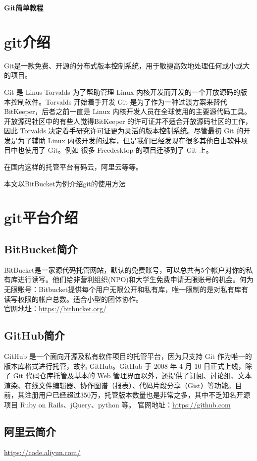 \documentclass[a4paper,12pt]{ctexart}
\begin{document}
\begin{center}
\huge \textbf{Git简单教程}
\end{center}

\tableofcontents
\newpage
\section{git介绍}
Git是一款免费、开源的分布式版本控制系统，用于敏捷高效地处理任何或小或大的项目。

Git 是 Linus Torvalds 为了帮助管理 Linux 内核开发而开发的一个开放源码的版本控制软件。Torvalds 开始着手开发 Git 是为了作为一种过渡方案来替代 BitKeeper，后者之前一直是 Linux 内核开发人员在全球使用的主要源代码工具。开放源码社区中的有些人觉得BitKeeper 的许可证并不适合开放源码社区的工作，因此 Torvalds 决定着手研究许可证更为灵活的版本控制系统。尽管最初 Git 的开发是为了辅助 Linux 内核开发的过程，但是我们已经发现在很多其他自由软件项目中也使用了 Git。例如 很多 Freedesktop 的项目迁移到了 Git 上。

在国内这样的托管平台有码云，阿里云等等。

\textcolor[rgb]{0.00,1.00,0.25}{本文以BitBucket为例介绍git的使用方法}
\section{git平台介绍}
\subsection{BitBucket简介}
BitBucket是一家源代码托管网站，默认的免费账号，可以总共有5个帐户对你的私有库进行读写。他们给非营利组织(NPO)和大学生免费申请无限账号的机会。何为无限账号：Bitbucket提供每个用户无限公开和私有库，唯一限制的是对私有库有读写权限的帐户总数。适合小型的团体协作。\\
官网地址：\url{https://bitbucket.org/}
\subsection{GitHub简介}
GitHub 是一个面向开源及私有软件项目的托管平台，因为只支持 Git 作为唯一的版本库格式进行托管，故名 GitHub。GitHub 于 2008 年 4 月 10 日正式上线，除了 Git 代码仓库托管及基本的 Web 管理界面以外，还提供了订阅、讨论组、文本渲染、在线文件编辑器、协作图谱（报表）、代码片段分享（Gist）等功能。目前，其注册用户已经超过350万，托管版本数量也是非常之多，其中不乏知名开源项目 Ruby on Rails、jQuery、python 等。
官网地址：\url{https://github.com}
\subsection{阿里云简介}
\url{https://code.aliyun.com/}
\end{document}
